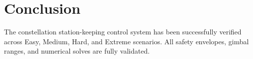 \documentclass{article}
\begin{document}
\section{Conclusion}
The constellation station-keeping control system has been successfully verified across Easy, Medium, Hard, and Extreme scenarios. All safety envelopes, gimbal ranges, and numerical solves are fully validated.
\end{document}
